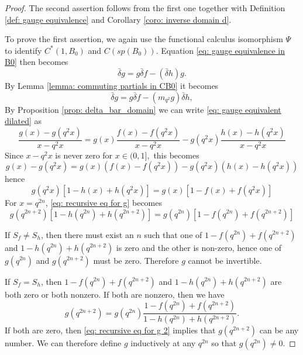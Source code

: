 \documentclass[10pt,a4paper]{amsart}
\def\d{\bar{\delta}}
\begin{document}
\begin{proof}
The second assertion follows from the first one together with  Definition \ref{def: gauge equivalence} and Corollary \ref{coro: inverse domain d}.

    To prove the first assertion, we again use the functional calculus isomorphism $\Psi$ to identify $C^*(1, B_0)$ and $C(sp(B_0))$. Equation \eqref{eq: gauge equivalence in B0} then becomes $$\d g = g \d f - (\d h) g.$$
    By Lemma \ref{lemma: commuting partials in CB0} it becomes 
    \begin{equation}\label{eq: gauge equivalent dilated}
    \d g = g \d f - (m_{q^2} g) \d h,
    \end{equation}
    By Proposition \ref{prop: delta_bar_domain}  we can write \eqref{eq: gauge equivalent dilated}  as \begin{equation}
    \frac{g(x) - g(q^2x)}{x - q^2x} = g(x) \frac{f(x) - f(q^2x)}{x - q^2x} - g(q^2x) \frac{h(x) - h(q^2x)}{x - q^2x}
    \end{equation}
    Since $x - q^2x$ is never zero for $x \in (0,1],$ this becomes \[
    g(x) - g(q^2x) = g(x) (f(x) - f(q^2x)) - g(q^2x) (h(x) - h(q^2x))
    \]
    hence \begin{equation}\label{eq: recursive eq for g}
    g(q^2x)[1 - h(x) + h(q^2x)] = g(x)[1 - f(x) + f(q^2x)]
    \end{equation}
    For $x=q^{2n}$, \eqref{eq: recursive eq for g} becomes
    \begin{equation}\label{eq: recursive eq for g 2}
    g(q^{2n+2})[1 - h(q^{2n}) + h(q^{2n+2})] = g(q^{2n})[1 - f(q^{2n}) + f(q^{2n+2})]
    \end{equation}

If $S_f\neq S_h$, then there must exist an $n$ such that one of $1 - f(q^{2n}) + f(q^{2n+2})$ and $1 - h(q^{2n}) + h(q^{2n+2})$ is zero and the other is non-zero, hence one of $g(q^{2n})$ and $g(q^{2n+2})$ must be zero. Therefore $g$ cannot be invertible.

    If $S_f= S_h$, then $1 - f(q^{2n}) + f(q^{2n+2})$ and $1 - h(q^{2n}) + h(q^{2n+2})$ are both zero or both nonzero. If both are nonzero, then we have 
    \begin{equation}
    g(q^{2n+2})=g(q^{2n})\frac{1 - f(q^{2n}) + f(q^{2n+2})}{1 - h(q^{2n}) + h(q^{2n+2})}.
    \end{equation}
    If both are zero, then \eqref{eq: recursive eq for g 2} implies that $g(q^{2n+2})$ can be any number. We can therefore define $g$ inductively at any $q^{2n}$ so that $g(q^{2n})\neq 0$.


\end{proof}
\end{document}

